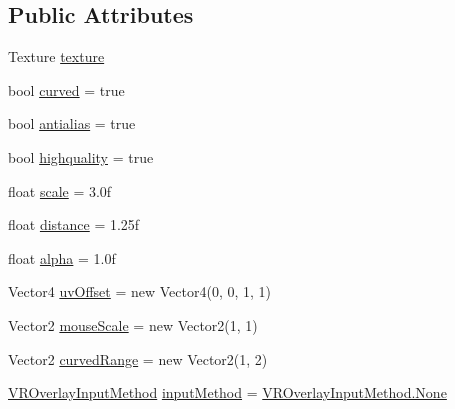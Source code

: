 \subsection*{Public Attributes}
\begin{DoxyCompactItemize}
\item 
Texture \mbox{\hyperlink{class_valve_1_1_v_r_1_1_steam_v_r___overlay_a13d7949fb63f9c40747ff9298bbffad3}{texture}}
\item 
bool \mbox{\hyperlink{class_valve_1_1_v_r_1_1_steam_v_r___overlay_a45a4aeb432c73905b805505a3a46688b}{curved}} = true
\item 
bool \mbox{\hyperlink{class_valve_1_1_v_r_1_1_steam_v_r___overlay_a6020148bd8028864fdce96e0fe4f52e1}{antialias}} = true
\item 
bool \mbox{\hyperlink{class_valve_1_1_v_r_1_1_steam_v_r___overlay_a7826db14b3da23e8a1e88835cab88b21}{highquality}} = true
\item 
float \mbox{\hyperlink{class_valve_1_1_v_r_1_1_steam_v_r___overlay_a1b0a9f1bfd10945fe1d475537575e122}{scale}} = 3.\+0f
\item 
float \mbox{\hyperlink{class_valve_1_1_v_r_1_1_steam_v_r___overlay_a3d408a02ce99a9e017d2d5c279fd03ab}{distance}} = 1.\+25f
\item 
float \mbox{\hyperlink{class_valve_1_1_v_r_1_1_steam_v_r___overlay_ac2832ae5e87b5dd56011f407a0fef979}{alpha}} = 1.\+0f
\item 
Vector4 \mbox{\hyperlink{class_valve_1_1_v_r_1_1_steam_v_r___overlay_a9ae56d401609af890ea24c0483bf892f}{uv\+Offset}} = new Vector4(0, 0, 1, 1)
\item 
Vector2 \mbox{\hyperlink{class_valve_1_1_v_r_1_1_steam_v_r___overlay_a62734dd5ae8fc395ea0353607404cd1a}{mouse\+Scale}} = new Vector2(1, 1)
\item 
Vector2 \mbox{\hyperlink{class_valve_1_1_v_r_1_1_steam_v_r___overlay_a35a9b57a219abab8d524148e07c41145}{curved\+Range}} = new Vector2(1, 2)
\item 
\mbox{\hyperlink{namespace_valve_1_1_v_r_a43f4e4c6980efb8b0d2a954640203d74}{V\+R\+Overlay\+Input\+Method}} \mbox{\hyperlink{class_valve_1_1_v_r_1_1_steam_v_r___overlay_a4403bb8497e4ad304c5ff45cd8387932}{input\+Method}} = \mbox{\hyperlink{namespace_valve_1_1_v_r_a43f4e4c6980efb8b0d2a954640203d74a6adf97f83acf6453d4a6a4b1070f3754}{V\+R\+Overlay\+Input\+Method.\+None}}
\end{DoxyCompactItemize}
